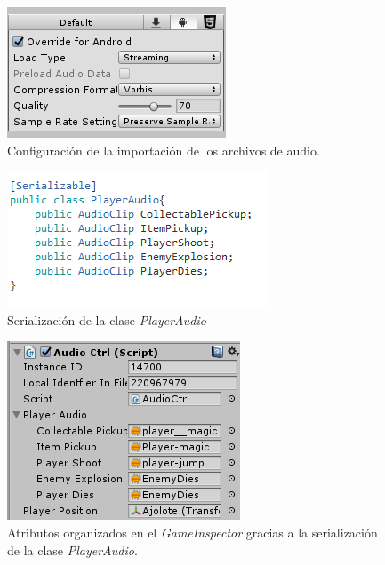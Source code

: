 	\begin{figure}[h]
		\centering
		\includegraphics[height=0.15 \textheight]{03TrabajoRealizado/imagenes/playerAudioConfig.png}
		\caption{Configuración de la importación de los archivos de audio.}
		\label{fig:AudioClipConfi}
	\end{figure}

	\begin{figure}[h]
		\centering
		\includegraphics[height=0.15 \textheight]{03TrabajoRealizado/imagenes/playerAudio.png}
		\caption{Serialización de la clase \textit{PlayerAudio}}
		\label{fig:PlayerAudio}
	\end{figure}


	\begin{figure}[h]
		\centering
		\includegraphics[height=0.1 \textheight]{03TrabajoRealizado/imagenes/audioCtrlGameInsp.png}
		\caption{Atributos organizados en el \textit{GameInspector} gracias a la serialización de la clase \textit{PlayerAudio}.}
		\label{fig:PlayerAudioConf}
	\end{figure}

